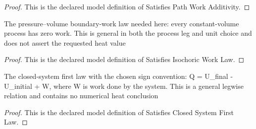 \begin{proof}
  This is the declared model definition of Satisfies Path Work Additivity.
\end{proof}
\begin{definition}
  \label{def:physics:phyx-mini-0341:phyxminiproblems-problemphyxmini0341-satisfiesisochoricworklaw}
  The pressure--volume boundary-work law needed here: every constant-volume process has zero work. This is general in both the process leg and unit choice and does not assert the requested heat value
\end{definition}
\begin{proof}
  This is the declared model definition of Satisfies Isochoric Work Law.
\end{proof}
\begin{definition}
  \label{def:physics:phyx-mini-0341:phyxminiproblems-problemphyxmini0341-satisfiesclosedsystemfirstlaw}
  The closed-system first law with the chosen sign convention: Q = U\_final - U\_initial + W, where W is work done by the system. This is a general legwise relation and contains no numerical heat conclusion
\end{definition}
\begin{proof}
  This is the declared model definition of Satisfies Closed System First Law.
\end{proof}
